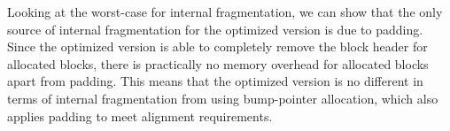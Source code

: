Looking at the worst-case for internal fragmentation, we can show that the only source of internal fragmentation for the optimized version is due to padding. Since the optimized version is able to completely remove the block header for allocated blocks, there is practically no memory overhead for allocated blocks apart from padding. This means that the optimized version is no different in terms of internal fragmentation from using bump-pointer allocation, which also applies padding to meet alignment requirements.

